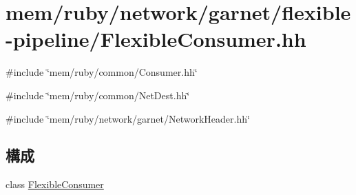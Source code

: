 \hypertarget{FlexibleConsumer_8hh}{
\section{mem/ruby/network/garnet/flexible-\/pipeline/FlexibleConsumer.hh}
\label{FlexibleConsumer_8hh}
}
{\ttfamily \#include \char`\"{}mem/ruby/common/Consumer.hh\char`\"{}}\par
{\ttfamily \#include \char`\"{}mem/ruby/common/NetDest.hh\char`\"{}}\par
{\ttfamily \#include \char`\"{}mem/ruby/network/garnet/NetworkHeader.hh\char`\"{}}\par
\subsection*{構成}
\begin{DoxyCompactItemize}
\item 
class \hyperlink{classFlexibleConsumer}{FlexibleConsumer}
\end{DoxyCompactItemize}
